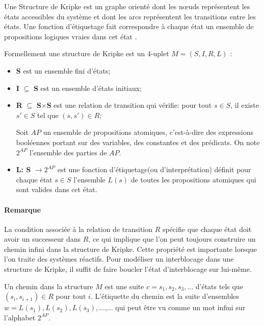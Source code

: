 \begin{definition}
Une Structure de Kripke est un graphe orienté dont les nœuds représentent les états accessibles du système et dont les arcs représentent les transitions entre les états. Une fonction d'étiquetage fait correspondre à chaque état un ensemble de propositions logiques vraies dans cet état \citep{Kripke1963}.

Formellement une structure de Kripke est un 4-uplet ${\displaystyle M=(S,I,R,L)}$ \citep{Edmund1999}:
\begin{itemize}
	\item \textbf{S} est un ensemble fini d'états;
	\item \textbf{I} $\subseteq$ \textbf{S} est un ensemble d'états initiaux;
	\item \textbf{R} $\subseteq$ \textbf{S}$\times$\textbf{S}  est une relation de transition qui vérifie: pour tout ${\displaystyle s\in S}$, il existe ${\displaystyle s'\in S} $ tel que ${\displaystyle (s,s')\in R}$;
	
Soit ${\displaystyle AP}$ un ensemble de propositions atomiques, c'est-à-dire des expressions booléennes portant sur des variables, des constantes et des prédicats. On note ${\displaystyle 2^{AP}} $ l'ensemble des parties de ${\displaystyle AP}$.
	\item \textbf{L: S} $\rightarrow 2^{AP}$ est une fonction d'étiquetage(ou d'interprétation) définit pour chaque état ${\displaystyle s\in S}$ l'ensemble ${\displaystyle L(s)}$ de toutes les propositions atomiques qui sont valides dans cet état.
\end{itemize}

\paragraph{Remarque}
La condition associée à la relation de transition ${\displaystyle R}$ spécifie que chaque état doit avoir un successeur dans ${\displaystyle R}$, ce qui implique que l'on peut toujours construire un chemin infini dans la structure de Kripke. Cette propriété est importante lorsque l'on traite des systèmes réactifs\citep{Klaus2004}. Pour modéliser un interblocage dans une structure de Kripke, il suffit de faire boucler l'état d'interblocage sur lui-même.


Un chemin dans la structure ${\displaystyle M}$ est une suite ${\displaystyle c=s_{1},s_{2},s_{3},\ldots }$ d'états tels que ${\displaystyle (s_{i},s_{i+1})\in R}$ pour tout ${\displaystyle i}$. L'étiquette du chemin est la suite d'ensembles ${\displaystyle w=L(s_{1}),L(s_{2}),L(s_{3}),\ldots }$,$\ldots$ qui peut être vu comme un mot infini sur l'alphabet ${\displaystyle 2^{AP}}$.

\end{definition}

